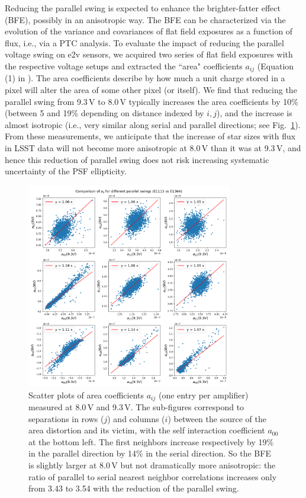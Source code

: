 Reducing the parallel swing is expected to enhance the brighter-fatter
effect (BFE), possibly in an anisotropic way. The BFE can be
characterized via the evolution of the variance and covariances of
flat field exposures as a function of flux, i.e., via a PTC analysis. To evaluate the
impact of reducing the parallel voltage swing on e2v sensors, we
acquired two series of flat field exposures with the respective voltage
setups and extracted the ``area" coefficients $a_{ij}$
(Equation (1) in \citet{2023A&A...670A.118A}).
The area coefficients describe by how much a unit charge stored in
a pixel will alter the area of some other pixel (or itself). We find that
reducing the parallel swing from 9.3\,V to 8.0\,V typically increases the
area coefficients by 10\% (between 5 and 19\% depending on distance indexed by $i,j$),
and the increase is almost isotropic (i.e., very similar along serial and parallel
directions; see Fig.~\ref{fig:area-coeffs}). From these measurements, we anticipate that the increase of
star sizes with flux in LSST data will not become more anisotropic at 8.0\,V than it was at
9.3\,V, and hence this reduction of parallel swing does not 
risk increasing systematic uncertainty of the PSF ellipticity.

\begin{figure}
\begin{centering}
\includegraphics[width=0.8\textwidth]{figures/aScatterPlots8vs9-3.png}
\end{centering}
\caption{Scatter plots of area coefficients $a_{ij}$ (one entry per amplifier)
measured at 8.0\,V and 9.3\,V. The sub-figures correspond to separations in rows ($j$) and columns ($i$)
between the source of the area distortion and its victim, with the self
interaction coefficient $a_{00}$ at the bottom left. The first neighbors increase
respectively by 19\% in the parallel direction by 14\% in the serial
direction. So the BFE is slightly larger at 8.0\,V but not dramatically
more anisotropic: the ratio of parallel to serial nearest neighbor correlations increases only from 3.43 to 3.54 with the reduction of the parallel swing.}
\label{fig:area-coeffs}
\end{figure}


